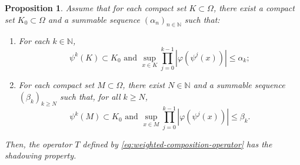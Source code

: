 \documentclass[11pt]{amsart}
\newtheorem{proposition}{Proposition}
\theoremstyle{definition}
\theoremstyle{remark}
\theoremstyle{plain}
\begin{document}

\begin{proposition}\label{prop:compact-open-shadowing}
Assume that for each compact set \(K\subset\Omega\), there exist
a compact set \(K_0\subset\Omega\) and a summable sequence
\((\alpha_n)_{n\in\mathbb{N}}\) such that:
\begin{enumerate}[{\rm (a)}]
\item For each \(k\in\mathbb{N}\),
\[
\psi^k(K)\subset K_0
\text{ and }
\sup_{x\in K}\prod_{j=0}^{k-1}|\varphi(\psi^j(x))|
\le \alpha_k;
\]

\item
For each compact set \(M\subset\Omega\), there exist
\(N\in\mathbb{N}\) and a summable sequence
\((\beta_k)_{k\ge N}\) such that, for all \(k\ge N\),
\[
\psi^k(M)\subset K_0
\text{ and }
\sup_{x\in M}\prod_{j=0}^{k-1}|\varphi(\psi^j(x))|
\le \beta_k .
\]
\end{enumerate}
Then, the operator \(T\) defined
by \eqref{eq:weighted-composition-operator} has the shadowing property.
\end{proposition}
\end{document}
